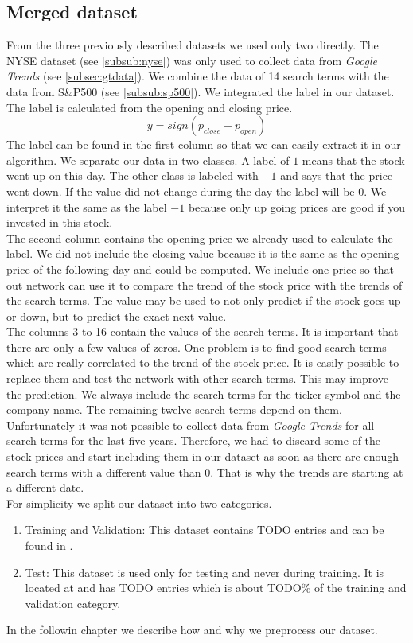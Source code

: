 \subsection{Merged dataset}
\label{subsec:merged}
From the three previously described datasets we used only two directly. The NYSE dataset (see \ref{subsub:nyse}) was only used to collect data from \textit{Google Trends} (see \ref{subsec:gtdata}). We combine the data of 14 search terms with the data from S\&P500 (see \ref{subsub:sp500}). We integrated the label in our dataset. The label is calculated from the opening and closing price.
\begin{equation}
y = sign(p_{close} - p_{open})
\end{equation}
The label can be found in the first column so that we can easily extract it in our algorithm. We separate our data in two classes. A label of $1$ means that the stock went up on this day. The other class is labeled with $-1$ and says that the price went down. If the value did not change during the day the label will be $0$. We interpret it the same as the label $-1$ because only up going prices are good if you invested in this stock.\\
The second column contains the opening price we already used to calculate the label. We did not include the closing value because it is the same as the opening price of the following day and could be computed. We include one price so that out network can use it to compare the trend of the stock price with the trends of the search terms. The value may be used to not only predict if the stock goes up or down, but to predict the exact next value.\\
The columns 3 to 16 contain the values of the search terms. It is important that there are only a few values of zeros. One problem is to find good search terms which are really correlated to the trend of the stock price. It is easily possible to replace them and test the network with other search terms. This may improve the prediction. We always include the search terms for the ticker symbol and the company name. The remaining twelve search terms depend on them.\\
Unfortunately it was not possible to collect data from \textit{Google Trends} for all search terms for the last five years. Therefore, we had to discard some of the stock prices and start including them in our dataset as soon as there are enough search terms with a different value than $0$. That is why the trends are starting at a different date.\\
For simplicity we split our dataset into two categories.
\begin{enumerate}
	\item Training and Validation: This dataset contains $\text{TODO}$ entries and can be found in \mbox{}.
	\item Test: This dataset is used only for testing and never during training. It is located at \mbox{} and has $\text{TODO}$ entries which is about $\text{TODO}\%$ of the training and validation category.
\end{enumerate}
In the followin chapter we describe how and why we preprocess our dataset.
